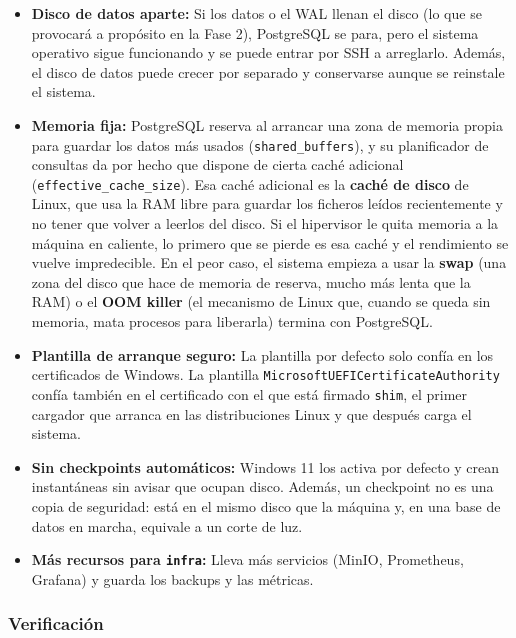 \documentclass[11pt, a4paper, titlepage]{article}
\newcommand{\cod}[1]{\texttt{#1}}
\begin{document}
\begin{itemize}
    \item \textbf{Disco de datos aparte:} Si los datos o el WAL llenan el disco (lo que se provocará a propósito en la Fase 2), PostgreSQL se para, pero el sistema operativo sigue funcionando y se puede entrar por SSH a arreglarlo. Además, el disco de datos puede crecer por separado y conservarse aunque se reinstale el sistema.

    \item \textbf{Memoria fija:} PostgreSQL reserva al arrancar una zona de memoria propia para guardar los datos más usados (\cod{shared\_buffers}), y su planificador de consultas da por hecho que dispone de cierta caché adicional (\cod{effective\_cache\_size}). Esa caché adicional es la \textbf{caché de disco} de Linux, que usa la RAM libre para guardar los ficheros leídos recientemente y no tener que volver a leerlos del disco. Si el hipervisor le quita memoria a la máquina en caliente, lo primero que se pierde es esa caché y el rendimiento se vuelve impredecible. En el peor caso, el sistema empieza a usar la \textbf{swap} (una zona del disco que hace de memoria de reserva, mucho más lenta que la RAM) o el \textbf{OOM killer} (el mecanismo de Linux que, cuando se queda sin memoria, mata procesos para liberarla) termina con PostgreSQL.

    \item \textbf{Plantilla de arranque seguro:} La plantilla por defecto solo confía en los certificados de Windows. La plantilla \cod{Microsoft\-UEFI\-Certificate\-Authority} confía también en el certificado con el que está firmado \cod{shim}, el primer cargador que arranca en las distribuciones Linux y que después carga el sistema.

    \item \textbf{Sin checkpoints automáticos:} Windows 11 los activa por defecto y crean instantáneas sin avisar que ocupan disco. Además, un checkpoint no es una copia de seguridad: está en el mismo disco que la máquina y, en una base de datos en marcha, equivale a un corte de luz.

    \item \textbf{Más recursos para \cod{infra}:} Lleva más servicios (MinIO, Prometheus, Grafana) y guarda los backups y las métricas.
\end{itemize}

\subsubsection{Verificación}
\end{document}
